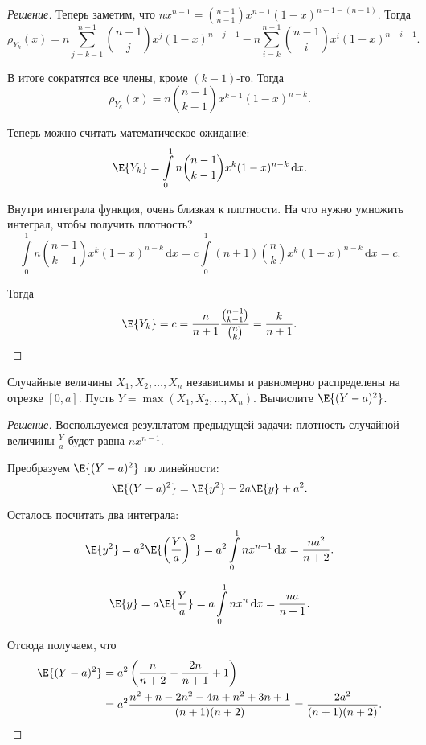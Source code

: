 \begin{proof}[Решение]
	Теперь заметим, что \(nx^{n - 1} = \binom{n - 1}{n - 1}x^{n - 1}(1 - x)^{n - 1 - (n - 1)}\). Тогда
	\[\rho_{Y_k}(x) = n\sum_{j = k - 1}^{n - 1}\binom{n - 1}{j}x^{j}(1 - x)^{n - j - 1} - n\sum_{i = k}^{n - 1}\binom{n - 1}{i}x^{i}(1 - x)^{n - i - 1}.\]
	
	В итоге сократятся все члены, кроме \((k - 1)\)-го. Тогда
	\[\rho_{Y_k}(x) = n\binom{n - 1}{k - 1}x^{k - 1}(1 - x)^{n - k}.\]
	
	Теперь можно считать математическое ожидание:
	\[\E{Y_k} = \int\limits_{0}^{1} n\binom{n - 1}{k - 1}x^{k}(1 - x)^{n - k}\,\mathrm{d}x.\]
	
	Внутри интеграла функция, очень близкая к плотности. На что нужно умножить интеграл, чтобы получить плотность?
	\[\int\limits_{0}^{1} n\binom{n - 1}{k - 1}x^{k}(1 - x)^{n - k}\,\mathrm{d}x = c\int\limits_{0}^{1} (n + 1)\binom{n}{k}x^{k}(1 - x)^{n - k}\,\mathrm{d}x = c.\]
	
	Тогда
	\[\E{Y_k} = c = \frac{n}{n + 1}\frac{\binom{n - 1}{k - 1}}{\binom{n}{k}} = \frac{k}{n + 1}.\qedhere\]
\end{proof}

\begin{problem}
	Случайные величины \(X_1, X_2, \dots, X_n\) независимы и равномерно распределены на отрезке \([0, a]\). Пусть \(Y = \max\left(X_1, X_2, \dots, X_n\right)\). Вычислите \(\E{(Y - a)^2}\).
\end{problem}
\begin{proof}[Решение]
	Воспользуемся результатом предыдущей задачи: плотность случайной величины \(\frac{Y}{a}\) будет равна \(nx^{n - 1}\). 
	
	Преобразуем \(\E{(Y - a)^2}\) по линейности:
	\[
	\E{(Y - a)^2} = \E{y^2} - 2a\E{y} + a^2.
	\]
	
	Осталось посчитать два интеграла:
	\[
	\E{y^2} = a^2\E{\left(\frac{Y}{a}\right)^2} = a^2\int\limits_{0}^{1} nx^{n + 1}\,\mathrm{d}x = \frac{na^2}{n + 2}.
	\]
	
	\[
	\E{y} = a\E{\frac{Y}{a}} = a\int\limits_{0}^{1} nx^{n}\,\mathrm{d}x = \frac{na}{n + 1}.
	\]
	
	Отсюда получаем, что
	\begin{align}
	\E{(Y - a)^2} &= a^2\left(\frac{n}{n + 2} - \frac{2n}{n + 1} + 1\right) \\
	&= a^2\frac{n^2 + n - 2n^2 - 4n + n^2 + 3n + 1}{(n + 1)(n + 2)} = \frac{2a^2}{(n + 1)(n + 2)}.\qedhere
	\end{align}
\end{proof}

